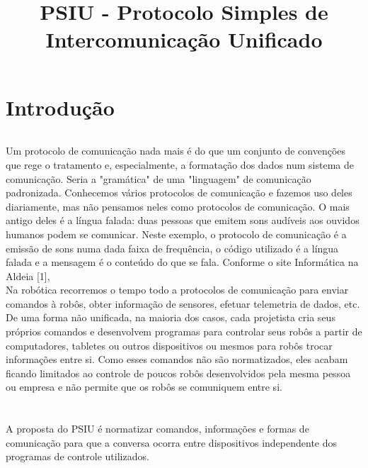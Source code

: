 \documentclass[11pt,	 papera4]{article}
\begin{document}
\title{PSIU - Protocolo Simples de Intercomunicação
Unificado}
\maketitle

\part*{Introdução \newline}

\paragraph*{} Um protocolo de comunicação nada mais é do que um conjunto de convenções que rege o tratamento e, especialmente, a formatação dos dados num sistema de comunicação. Seria a "gramática" de uma "linguagem" de comunicação padronizada. Conhecemos vários protocolos de comunicação e fazemos uso deles diariamente, mas não pensamos neles como protocolos de comunicação. O mais antigo deles é a língua falada: duas pessoas que emitem sons audíveis aos ouvidos humanos podem se comunicar. Neste exemplo, o protocolo de comunicação é a emissão de sons numa dada faixa de frequência, o código utilizado é a língua falada e a mensagem é o conteúdo do que se fala. Conforme o site Informática na Aldeia [1], \\

Na robótica recorremos o tempo todo a protocolos de comunicação para enviar comandos à robôs, obter informação de sensores, efetuar telemetria de dados, etc. De uma forma não unificada, na maioria dos casos, cada projetista cria seus próprios comandos e desenvolvem programas para controlar seus robôs a partir de computadores, tabletes ou outros dispositivos ou mesmos para robôs trocar informações entre si. 
Como esses comandos não são normatizados, eles acabam ficando limitados ao controle de poucos robôs desenvolvidos pela mesma pessoa ou empresa e não permite que os robôs se comuniquem entre si.\\
\\ \\

A proposta do PSIU é normatizar comandos, informações e formas de comunicação para que a conversa ocorra entre dispositivos independente dos programas de controle utilizados.\\ \\ \\
\end{document}
